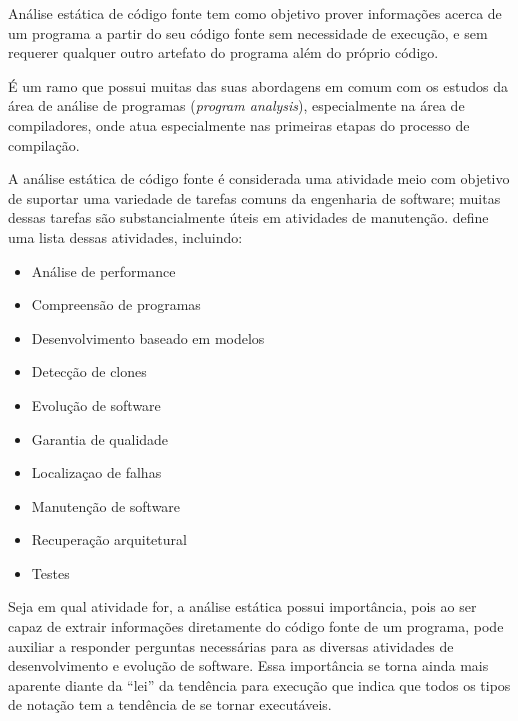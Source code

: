 %

Análise estática de código fonte tem como objetivo prover
informações acerca de um programa a partir do seu código fonte sem
necessidade de execução, e sem requerer qualquer outro artefato do programa
além do próprio código.

É um ramo que possui muitas das suas abordagens em comum com os estudos da
área de análise de programas ({\it program analysis}), especialmente na área de
compiladores, onde atua especialmente nas primeiras etapas do processo de compilação.

A análise estática de código fonte é considerada uma atividade meio com
objetivo de suportar uma variedade de tarefas comuns da engenharia de
software; muitas dessas tarefas são substancialmente úteis em atividades de
manutenção.  define uma lista dessas
atividades, incluindo:

\begin{multicols}{2}
  \begin{itemize}
    \item Análise de performance
    \item Compreensão de programas
    \item Desenvolvimento baseado em modelos
    \item Detecção de clones
    \item Evolução de software
    \item Garantia de qualidade
    \item Localizaçao de falhas
    \item Manutenção de software
    \item Recuperação arquitetural
    \item Testes
  \end{itemize}
\end{multicols}

Seja em qual atividade for, a análise estática possui importância,
pois ao ser capaz de extrair informações diretamente do
código fonte de um programa, pode auxiliar a responder perguntas necessárias
para as diversas atividades de desenvolvimento e evolução de software. Essa
importância se torna ainda mais aparente diante da ``lei'' da tendência para
execução \cite{Harman2010} que indica que todos os tipos de notação tem a
tendência de se tornar executáveis.

